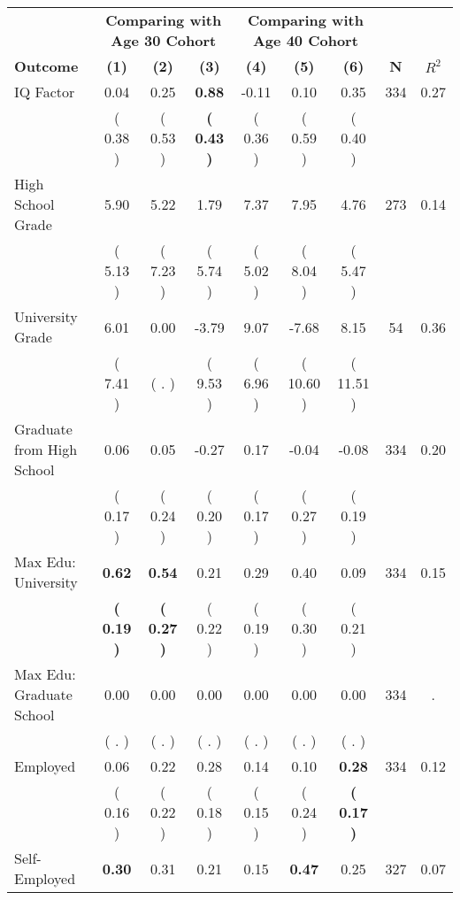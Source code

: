 \begin{tabular}{lcccccccc}
\toprule
 & \multicolumn{3}{c}{\textbf{Comparing with Age 30 Cohort}} & \multicolumn{3}{c}{\textbf{Comparing with Age 40 Cohort}} & \\
\cmidrule(lr){2-4} \cmidrule(lr){5-7} 
 \textbf{Outcome} & \textbf{(1)} & \textbf{(2)} & \textbf{(3)} & \textbf{(4)} & \textbf{(5)} & \textbf{(6)} & \textbf{N} & \textbf{$ R^2$} \\
\midrule
IQ Factor &      0.04 &      0.25 & \textbf{     0.88} &     -0.11 &      0.10 &      0.35 & 334 &       0.27 \\ 
 & (     0.38 ) & (     0.53 ) & \textbf{(     0.43 )} & (     0.36 ) & (     0.59 ) & (     0.40 ) & \\
High School Grade &      5.90 &      5.22 &      1.79 &      7.37 &      7.95 &      4.76 & 273 &       0.14 \\ 
 & (     5.13 ) & (     7.23 ) & (     5.74 ) & (     5.02 ) & (     8.04 ) & (     5.47 ) & \\
University Grade &      6.01 &      0.00 &     -3.79 &      9.07 &     -7.68 &      8.15 & 54 &       0.36 \\ 
 & (     7.41 ) & (        . ) & (     9.53 ) & (     6.96 ) & (    10.60 ) & (    11.51 ) & \\
Graduate from High School &      0.06 &      0.05 &     -0.27 &      0.17 &     -0.04 &     -0.08 & 334 &       0.20 \\ 
 & (     0.17 ) & (     0.24 ) & (     0.20 ) & (     0.17 ) & (     0.27 ) & (     0.19 ) & \\
Max Edu: University & \textbf{     0.62} & \textbf{     0.54} &      0.21 &      0.29 &      0.40 &      0.09 & 334 &       0.15 \\ 
 & \textbf{(     0.19 )} & \textbf{(     0.27 )} & (     0.22 ) & (     0.19 ) & (     0.30 ) & (     0.21 ) & \\
Max Edu: Graduate School &      0.00 &      0.00 &      0.00 &      0.00 &      0.00 &      0.00 & 334 &          . \\ 
 & (        . ) & (        . ) & (        . ) & (        . ) & (        . ) & (        . ) & \\
Employed &      0.06 &      0.22 &      0.28 &      0.14 &      0.10 & \textbf{     0.28} & 334 &       0.12 \\ 
 & (     0.16 ) & (     0.22 ) & (     0.18 ) & (     0.15 ) & (     0.24 ) & \textbf{(     0.17 )} & \\
Self-Employed & \textbf{     0.30} &      0.31 &      0.21 &      0.15 & \textbf{     0.47} &      0.25 & 327 &       0.07 \\ 

\end{tabular}
